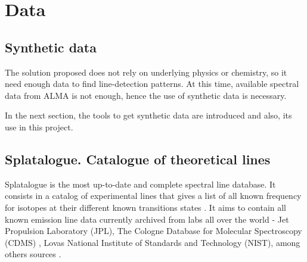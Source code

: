 \section{Data} \label{sec:data_origin}
 
\subsection{Synthetic data}
The solution proposed does not rely on underlying physics or chemistry, so it need enough data to find line-detection patterns.
At this time, available spectral data from ALMA is not enough, hence the use of synthetic data is necessary.


In the next section, the tools to get synthetic data are introduced and also, its use in this project.

\subsection{Splatalogue. Catalogue of theoretical lines}
Splatalogue is the most up-to-date and complete spectral line database.
%
It consists in a catalog of experimental lines that gives a list of all known frequency for isotopes at their different known transitions states \citep{remijan_splatalogue:_2008}.
%
It aims to contain all known emission line data currently archived from labs all over the world - Jet Propulsion Laboratory (JPL), The Cologne Database for Molecular Spectroscopy (CDMS) \citep{muller_cologne_2005}, Lovas National Institute of Standards and Technology (NIST), among others sources \citep{remijan_splatalogue_2010}.

